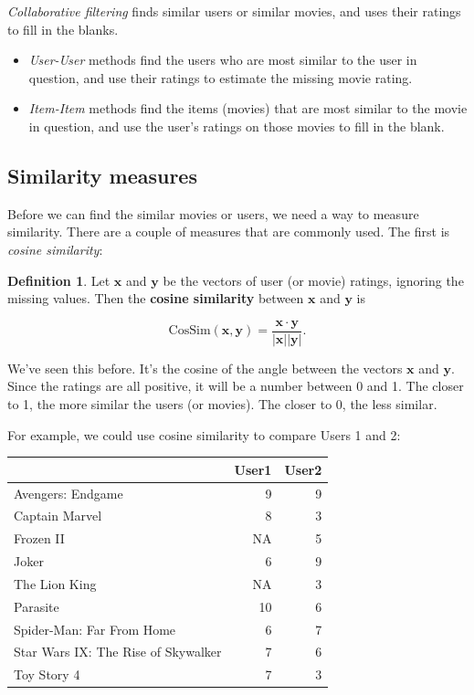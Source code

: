 \documentclass[
]{book}
\theoremstyle{definition}
\newtheorem{definition}{Definition}[chapter]
\theoremstyle{definition}
\theoremstyle{definition}
\theoremstyle{definition}
\theoremstyle{remark}
\begin{document}
\emph{Collaborative filtering} finds similar users or similar movies, and uses their ratings to fill in the blanks.

\begin{itemize}
\item
  \emph{User-User} methods find the users who are most similar to the user in question, and use their ratings to estimate the missing movie rating.
\item
  \emph{Item-Item} methods find the items (movies) that are most similar to the movie in question, and use the user's ratings on those movies to fill in the blank.
\end{itemize}

\subsection*{Similarity measures}\label{similarity-measures}

Before we can find the similar movies or users, we need a way to measure similarity. There are a couple of measures that are commonly used. The first is \emph{cosine similarity}:

\begin{defbox}

\begin{definition}
Let \(\mathbf{x}\) and \(\mathbf{y}\) be the vectors of user (or movie) ratings, ignoring the missing values. Then the \textbf{cosine similarity} between \(\mathbf{x}\) and \(\mathbf{y}\) is

\[\text{CosSim}(\mathbf{x},\mathbf{y})=\frac{\mathbf{x}\cdot \mathbf{y}}{|\mathbf{x}||\mathbf{y}|}.\]
\end{definition}

\end{defbox}

We've seen this before. It's the cosine of the angle between the vectors \(\mathbf{x}\) and \(\mathbf{y}\). Since the ratings are all positive, it will be a number between 0 and 1. The closer to 1, the more similar the users (or movies). The closer to 0, the less similar.

For example, we could use cosine similarity to compare Users 1 and 2:

\begin{longtable}{lrr}
\toprule
  & User1 & User2\\
\midrule
Avengers: Endgame & 9 & 9\\
Captain Marvel & 8 & 3\\
Frozen II & NA & 5\\
Joker & 6 & 9\\
The Lion King & NA & 3\\
Parasite & 10 & 6\\
Spider-Man: Far From Home & 6 & 7\\
Star Wars IX: The Rise of Skywalker & 7 & 6\\
Toy Story 4 & 7 & 3\\
\bottomrule
\end{longtable}
\end{document}
